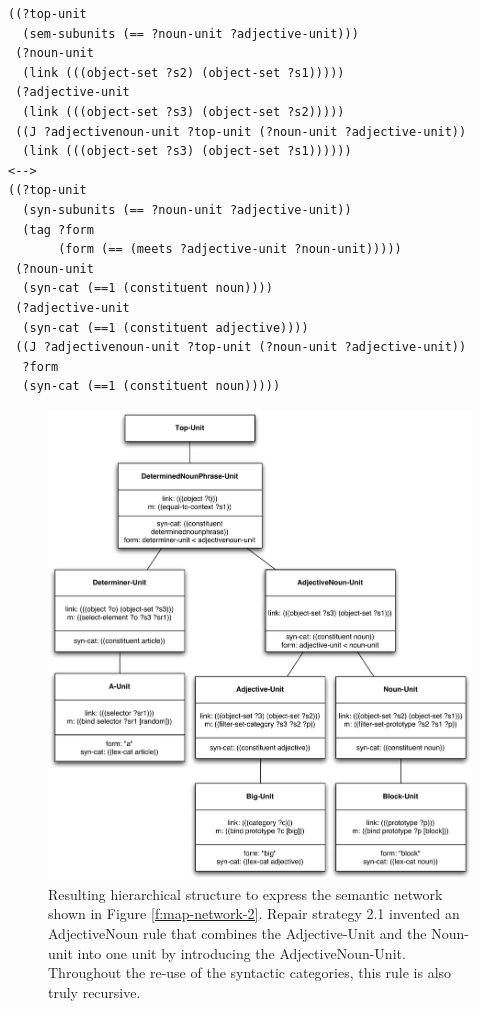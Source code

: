 \footnotesize
{}
\begin{lstlisting}
((?top-unit 
  (sem-subunits (== ?noun-unit ?adjective-unit)))
 (?noun-unit 
  (link (((object-set ?s2) (object-set ?s1)))))
 (?adjective-unit 
  (link (((object-set ?s3) (object-set ?s2)))))
 ((J ?adjectivenoun-unit ?top-unit (?noun-unit ?adjective-unit))
  (link (((object-set ?s3) (object-set ?s1))))))
<-->
((?top-unit
  (syn-subunits (== ?noun-unit ?adjective-unit))
  (tag ?form 
       (form (== (meets ?adjective-unit ?noun-unit)))))
 (?noun-unit
  (syn-cat (==1 (constituent noun))))
 (?adjective-unit 
  (syn-cat (==1 (constituent adjective))))
 ((J ?adjectivenoun-unit ?top-unit (?noun-unit ?adjective-unit))
  ?form
  (syn-cat (==1 (constituent noun)))))
\end{lstlisting}
\normalsize

\begin{figure}[htbp]
  \begin{center}
    \includegraphics[width=\textwidth]{./composition/figures/learning-3.pdf}
    \caption[Third resulting linguistic structure to express semantic
    constraint networks which is hierarchical]{Resulting hierarchical structure
      to express the semantic network shown in Figure
      \ref{f:map-network-2}. Repair strategy 2.1 invented an
      AdjectiveNoun rule that combines the Adjective-Unit and the
      Noun-unit into one unit by introducing the
      AdjectiveNoun-Unit. Throughout the re-use of the syntactic
      categories, this rule is also truly recursive.}
    \label{f:map-structure-3}
  \end{center}
\end{figure}

